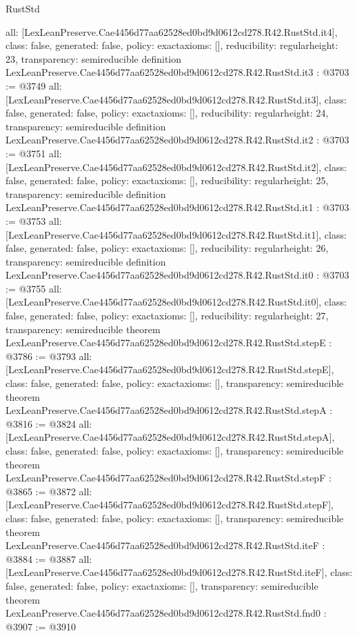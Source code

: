 \begin{lexlean}{RustStd}
\begin{coremodule}
{  all: [LexLeanPreserve.Cae4456d77aa62528ed0bd9d0612cd278.R42.RustStd.it4],
  class: false,
  generated: false,
  policy: exact{axioms: []},
  reducibility: regular{height: 23},
  transparency: semireducible
}
definition LexLeanPreserve.Cae4456d77aa62528ed0bd9d0612cd278.R42.RustStd.it3 : @3703 := @3749 {
  all: [LexLeanPreserve.Cae4456d77aa62528ed0bd9d0612cd278.R42.RustStd.it3],
  class: false,
  generated: false,
  policy: exact{axioms: []},
  reducibility: regular{height: 24},
  transparency: semireducible
}
definition LexLeanPreserve.Cae4456d77aa62528ed0bd9d0612cd278.R42.RustStd.it2 : @3703 := @3751 {
  all: [LexLeanPreserve.Cae4456d77aa62528ed0bd9d0612cd278.R42.RustStd.it2],
  class: false,
  generated: false,
  policy: exact{axioms: []},
  reducibility: regular{height: 25},
  transparency: semireducible
}
definition LexLeanPreserve.Cae4456d77aa62528ed0bd9d0612cd278.R42.RustStd.it1 : @3703 := @3753 {
  all: [LexLeanPreserve.Cae4456d77aa62528ed0bd9d0612cd278.R42.RustStd.it1],
  class: false,
  generated: false,
  policy: exact{axioms: []},
  reducibility: regular{height: 26},
  transparency: semireducible
}
definition LexLeanPreserve.Cae4456d77aa62528ed0bd9d0612cd278.R42.RustStd.it0 : @3703 := @3755 {
  all: [LexLeanPreserve.Cae4456d77aa62528ed0bd9d0612cd278.R42.RustStd.it0],
  class: false,
  generated: false,
  policy: exact{axioms: []},
  reducibility: regular{height: 27},
  transparency: semireducible
}
theorem LexLeanPreserve.Cae4456d77aa62528ed0bd9d0612cd278.R42.RustStd.stepE : @3786 := @3793 {
  all: [LexLeanPreserve.Cae4456d77aa62528ed0bd9d0612cd278.R42.RustStd.stepE],
  class: false,
  generated: false,
  policy: exact{axioms: []},
  transparency: semireducible
}
theorem LexLeanPreserve.Cae4456d77aa62528ed0bd9d0612cd278.R42.RustStd.stepA : @3816 := @3824 {
  all: [LexLeanPreserve.Cae4456d77aa62528ed0bd9d0612cd278.R42.RustStd.stepA],
  class: false,
  generated: false,
  policy: exact{axioms: []},
  transparency: semireducible
}
theorem LexLeanPreserve.Cae4456d77aa62528ed0bd9d0612cd278.R42.RustStd.stepF : @3865 := @3872 {
  all: [LexLeanPreserve.Cae4456d77aa62528ed0bd9d0612cd278.R42.RustStd.stepF],
  class: false,
  generated: false,
  policy: exact{axioms: []},
  transparency: semireducible
}
theorem LexLeanPreserve.Cae4456d77aa62528ed0bd9d0612cd278.R42.RustStd.iteF : @3884 := @3887 {
  all: [LexLeanPreserve.Cae4456d77aa62528ed0bd9d0612cd278.R42.RustStd.iteF],
  class: false,
  generated: false,
  policy: exact{axioms: []},
  transparency: semireducible
}
theorem LexLeanPreserve.Cae4456d77aa62528ed0bd9d0612cd278.R42.RustStd.fnd0 : @3907 := @3910 {
}
\end{coremodule}
\end{lexlean}
